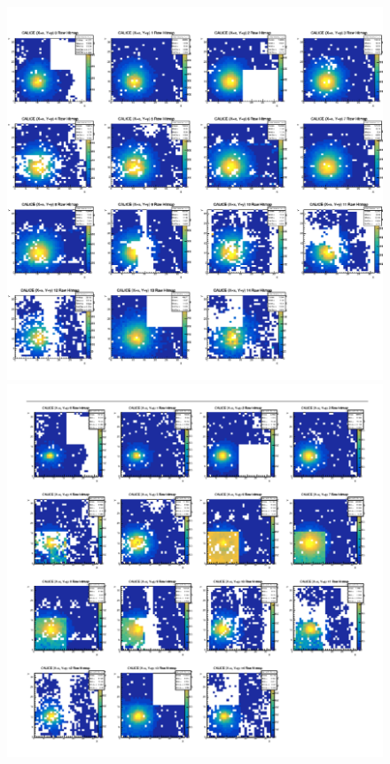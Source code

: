 \begin{figure}[H]
  \begin{minipage}[b]{0.45\linewidth}
    \centering
    \includegraphics[keepaspectratio, scale=0.2]{Figure/Beamtest/hitmap_e20.png}
  \end{minipage}
    \begin{minipage}[b]{0.45\linewidth}
    \centering
    \includegraphics[keepaspectratio, scale=0.2]{Figure/Beamtest/hitmap_e150.png}

\end{minipage}
\end{figure}
